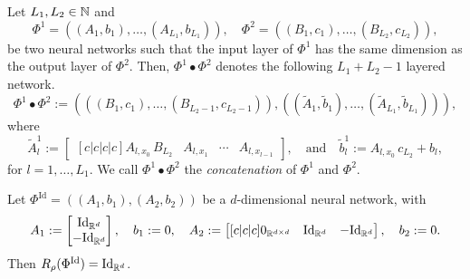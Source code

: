 \begin{definition} \label{def: network concatenation}
    Let $L_1, L_2 \in \mathbb{N}$ and 
    \begin{equation*}
        \Phi^1 = ((A_1, b_1), \dots, (A_{L_1}, b_{L_1})), \quad \Phi^2 = ((B_1, c_1), \dots, (B_{L_2}, c_{L_2})),
    \end{equation*}
    be two neural networks such that the input layer of $\Phi^1$ has the same dimension as the output layer of $\Phi^2$.
    Then, $\Phi^1 \bullet \Phi^2$ denotes the following $L_1 + L_2 - 1$ layered network.
    \begin{equation*}
        \Phi^1 \bullet \Phi^2 := \left( ((B_1, c_1), \dots, (B_{L_2 - 1}, c_{L_2 - 1})), ((\tilde{A}_1, \tilde{b}_1), \dots, (\tilde{A}_{L_1}, \tilde{b}_{L_1})) \right),
    \end{equation*}
    where
    \begin{equation*}
        \tilde{A}_l^1 := \begin{bmatrix}[c|c|c|c]A_{l, x_0} \, B_{L_2} & A_{l, x_1} & \cdots & A_{l, x_{l-1}}\end{bmatrix},
        \quad \mbox{and} \quad \tilde{b}_l^1 := A_{l, x_0} \, c_{L_2} + b_l,
    \end{equation*}
    for $l = 1, \dots, L_1$. We call $\Phi^1 \bullet \Phi^2$ the \emph{concatenation} of $\Phi^1$ and $\Phi^2$.
\end{definition}

\begin{lemma}
    Let $\Phi^{\text{Id}} = ((A_1, b_1), (A_2, b_2))$ be a $d$-dimensional neural network, with
    \begin{equation*}
        A_1 := \begin{bmatrix} \text{Id}_{\mathbb{R}^d} \\ -\text{Id}_{\mathbb{R}^d} \end{bmatrix}, \quad b_1 := 0, \quad
        A_2 := \begin{bmatrix}[c|c|c] 0_{\mathbb{R}^{d \times d}} & \text{Id}_{\mathbb{R}^d} & - \text{Id}_{\mathbb{R}^d} \end{bmatrix}, \quad b_2 := 0.
    \end{equation*}
    Then $R_\rho(\Phi^{\text{Id}}) = \text{Id}_{\mathbb{R}^d}$.
\end{lemma}

